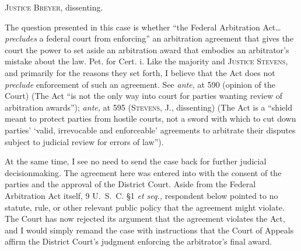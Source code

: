 
\setcounter{page}{596}

  \textsc{Justice Breyer,} dissenting.

  The question presented in this case is whether ``the Federal
Arbitration Act\dots \emph{precludes} a federal court from enforcing''
an arbitration agreement that gives the court the power to set aside
an arbitration award that embodies an arbitrator's mistake about the
law. Pet. for Cert. i. Like the majority and \textsc{Justice Stevens,}
and primarily for the reasons they set forth, I believe that the Act
does not \emph{preclude} enforcement of such an agreement. See \emph{ante,}
at 590 (opinion of the Court) (The Act ``is not the only way into
court for parties wanting review of arbitration awards''); \emph{ante,}
at 595 (\textsc{Stevens,} J., dissenting) (The Act is a ``shield meant to
protect parties from hostile courts, not a sword with which to cut
down parties' ‘valid, irrevocable and enforceable' agreements
to arbitrate their disputes subject to judicial review for errors of
law'').

  At the same time, I see no need to send the case back for further
judicial decisionmaking. The agreement here was entered into with
the consent of the parties and the approval of the District Court.
Aside from the Federal Arbitration Act itself, 9 U.~S.~C. \S1
\emph{et seq.,} respondent below pointed to no statute, rule, or other
relevant public policy that the agreement might violate. The Court has
now rejected its argument that the agreement violates the Act, and I
would simply remand the case with instructions that the Court of Appeals
affirm the District Court's judgment enforcing the arbitrator's
final award.
